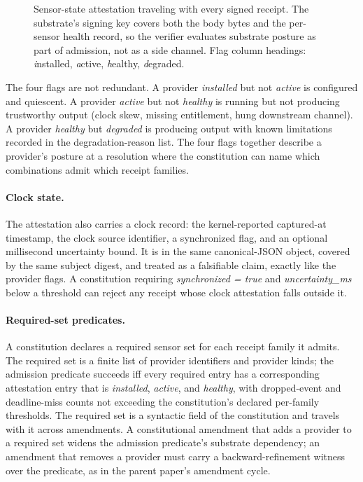 \begin{figure}[t]
\caption{Sensor-state attestation traveling with every signed receipt. The substrate's signing key covers both the body bytes and the per-sensor health record, so the verifier evaluates substrate posture as part of admission, not as a side channel. Flag column headings: \emph{i}nstalled, \emph{a}ctive, \emph{h}ealthy, \emph{d}egraded.}
\label{fig:attestation-layout}
\end{figure}

The four flags are not redundant. A provider \emph{installed} but not \emph{active} is configured and quiescent. A provider \emph{active} but not \emph{healthy} is running but not producing trustworthy output (clock skew, missing entitlement, hung downstream channel). A provider \emph{healthy} but \emph{degraded} is producing output with known limitations recorded in the degradation-reason list. The four flags together describe a provider's posture at a resolution where the constitution can name which combinations admit which receipt families.

\paragraph{Clock state.}
The attestation also carries a clock record: the kernel-reported captured-at timestamp, the clock source identifier, a synchronized flag, and an optional millisecond uncertainty bound. It is in the same canonical-JSON object, covered by the same subject digest, and treated as a falsifiable claim, exactly like the provider flags. A constitution requiring \emph{synchronized = true} and \emph{uncertainty\_ms} below a threshold can reject any receipt whose clock attestation falls outside it.

\paragraph{Required-set predicates.}
A constitution declares a required sensor set for each receipt family it admits. The required set is a finite list of provider identifiers and provider kinds; the admission predicate succeeds iff every required entry has a corresponding attestation entry that is \emph{installed}, \emph{active}, and \emph{healthy}, with dropped-event and deadline-miss counts not exceeding the constitution's declared per-family thresholds. The required set is a syntactic field of the constitution and travels with it across amendments. A constitutional amendment that adds a provider to a required set widens the admission predicate's substrate dependency; an amendment that removes a provider must carry a backward-refinement witness over the predicate, as in the parent paper's amendment cycle.

